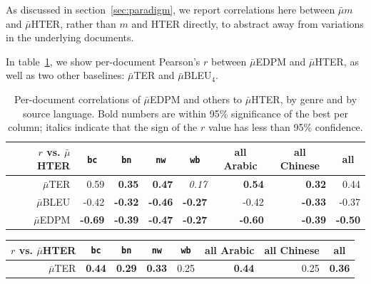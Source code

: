\documentclass{kluwer}    %
\begin{document}
\begin{article}
As discussed in section~\ref{sec:paradigm}, we report correlations
here between $\bar{\mu}m$ and $\bar{\mu}\textrm{HTER}$, rather
than $m$ and HTER directly, to abstract away from variations in the
underlying documents.

In table~\ref{tab:hterperdoc}, we show per-document Pearson's $r$
between $\bar{\mu}$EDPM and $\bar{\mu}$HTER, as well as two other
baselines: $\bar{\mu}$TER and $\bar{\mu}$BLEU$_4$.
\begin{subtable}
  \begin{table}
    \begin{tabular}{r|rrrr|rr|r}
      \hline
      $r$ vs. $\bar{\mu}$HTER & \multicolumn{1}{c}{\texttt{bc}}
      & \multicolumn{1}{c}{\texttt{bn}} &
      \multicolumn{1}{c}{\texttt{nw}} & \multicolumn{1}{c}{\texttt{wb}}
      & \multicolumn{1}{|c}{all Arabic} & \multicolumn{1}{c|}{all Chinese}
      & \multicolumn{1}{c}{all} \\
      \hline
      $\bar{\mu}$TER
      &  0.59 &  \textbf{0.35} &  \textbf{0.47}&  \textit{0.17}
      & \textbf{0.54} & \textbf{0.32} &  0.44\\
      $\bar{\mu}$BLEU
      & -0.42 & \textbf{-0.32} & \textbf{-0.46}&  \textbf{-0.27}
      & -0.42  &  \textbf{-0.33} & -0.37 \\
      $\bar{\mu}$EDPM
      & \textbf{-0.69} & \textbf{-0.39} & \textbf{-0.47} &
      \textbf{-0.27}
      & \textbf{-0.60} & \textbf{-0.39} & \textbf{-0.50} \\
      \hline
    \end{tabular}
    \caption{Per-document correlations of $\bar{\mu}$EDPM and others to
      $\bar{\mu}$HTER, by genre and by source language. Bold numbers are
      within 95\% significance of the best per column; italics indicate
      that the sign of the $r$ value has less than 95\% confidence.}
    \label{tab:hterperdoc}
  \end{table}
  \begin{table}
    \begin{tabular}{r|rrrr|rr|r}
      \hline
      $r$ vs. $\bar{\mu}$HTER & \multicolumn{1}{c}{\texttt{bc}}
      & \multicolumn{1}{c}{\texttt{bn}} &
      \multicolumn{1}{c}{\texttt{nw}} & \multicolumn{1}{c}{\texttt{wb}}
      & \multicolumn{1}{|c}{all Arabic} & \multicolumn{1}{c|}{all Chinese}
      & \multicolumn{1}{c}{all} \\
      \hline
      $\bar{\mu}$TER
      &  \textbf{0.44} &  \textbf{0.29} &  \textbf{0.33}&  0.25
      & \textbf{0.44} & 0.25  &  \textbf{0.36}\\

\end{tabular}
\end{table}
\end{subtable}
\end{article}
\end{document}
